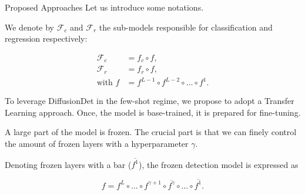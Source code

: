\begin{subsectionframemod}{Proposed Approaches}
     Let us introduce some notations.

     We denote by $\mathcal{F}_c$ and $\mathcal{F}_r$ the sub-models responsible for classification and regression respectively:

    \begin{align}
        \mathcal{F}_c &= f_c \circ f, \\
        \mathcal{F}_r &= f_r \circ f, \\
        \text{with } f &= f^{L-1} \circ f^{L-2} \circ \dots \circ f^1.
    \end{align}

     \pause

     To leverage DiffusionDet in the few-shot regime, we propose to adopt a Transfer Learning approach.
     Once, the model is base-trained, it is prepared for fine-tuning.

     A large part of the model is frozen.
     The crucial part is that we can finely control the amount of frozen layers with a hyperparameter $\gamma$.

    Denoting frozen layers with a bar (\eg $\overline{f^1}$), the frozen detection model is expressed as

    \begin{equation}
        f = f^L \circ \dots \circ f^{\gamma+1} \circ \overline{f^\gamma} \circ \dots \circ \overline{f^1}.
        \label{eq:frezze}
    \end{equation}


\end{subsectionframemod}